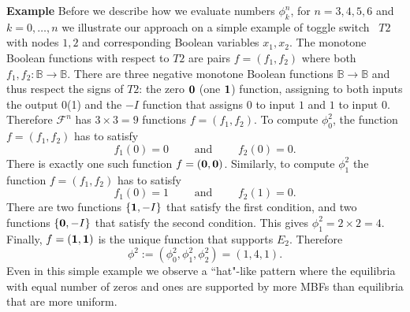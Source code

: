 \documentclass[11pt,a4paper]{article}
\newcommand{\bbB}{\mathbb{B}}
\theoremstyle{definition}
\theoremstyle{remark}
\begin{document}
{\bf Example}
Before we describe how we evaluate numbers $\phi_k^n$, for $n=3,4,5,6$ and $k=0, \ldots,n$ we illustrate our approach on a simple example of toggle switch~\parencite{gardner_construction_2000} $T2$ with nodes $1,2$ and corresponding Boolean variables $x_1, x_2$.
The monotone Boolean functions with respect to $T2$ are pairs $f=(f_1, f_2)$ where both 
$f_1, f_2 : \bbB \to \bbB$. There are three negative monotone Boolean functions $\bbB \to \bbB$ and thus  respect the signs of $T2$: the zero ${\bf 0}$ (one ${\bf 1}$) function, assigning to both inputs the output $0$(1) and  the $-I$ function that assigns $0$ to input $1$ and $1$ to input $0$. 
Therefore $\mathcal{ F}^n$ has $3\times 3 = 9 $ functions $f=(f_1, f_2)$.
To compute $\phi^2_0$, the function $f=(f_1,f_2)$ has to satisfy 
\[ f_1(0)=0 \qquad \mbox{ and } \qquad f_2(0)=0. \]
There is  exactly one such function $f=({\bf 0}, {\bf 0})$.
Similarly, to compute  $\phi^2_1$
the function $f=(f_1,f_2)$ has to satisfy 
\[ f_1(0)=1 \qquad \mbox{ and } \qquad f_2(1)=0.\]
There are two functions $\{{\bf 1}, -I\}$ that satisfy the first condition, and two functions 
$\{ {\bf 0},-I \}$ that satisfy the second condition. This gives $\phi^2_1= 2\times 2=4$.
Finally, $f=({\bf 1},{\bf 1})$ is the unique function that supports $E_2$.
Therefore 
\begin{equation}
 \phi^2:=(\phi^2_0, \phi^2_1, \phi^2_2) = (1,4,1) .
\end{equation}
Even in this simple example we observe a ``hat"-like pattern where the equilibria with equal number of zeros and ones are supported by more MBFs than equilibria that are more uniform.

\vskip0.2in
\end{document}

